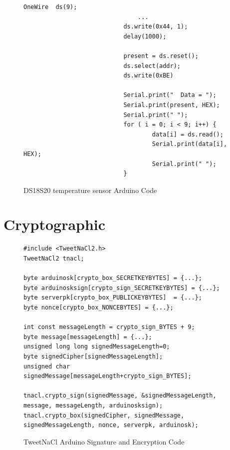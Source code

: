 \begin{figure}[H]
\begin{lstlisting}[style=Arduino]
  							OneWire  ds(9);
								...
  							ds.write(0x44, 1); 
  						 	delay(1000);

  							present = ds.reset();
  							ds.select(addr);    
 							ds.write(0xBE)

  							Serial.print("  Data = "); 
  							Serial.print(present, HEX);
 						 	Serial.print(" ");
  							for ( i = 0; i < 9; i++) {          
    								data[i] = ds.read();
    								Serial.print(data[i], HEX);
    								Serial.print(" ");
  							}

\end{lstlisting}
\caption{DS18S20 temperature sensor Arduino Code}
\label{snip:tempcode}
\end{figure}


\section{Cryptographic}
\begin{figure}[H]
\begin{lstlisting}[style=Arduino]
#include <TweetNaCl2.h>
TweetNaCl2 tnacl;

byte arduinosk[crypto_box_SECRETKEYBYTES] = {...};
byte arduinosksign[crypto_sign_SECRETKEYBYTES] = {...};
byte serverpk[crypto_box_PUBLICKEYBYTES]  = {...};
byte nonce[crypto_box_NONCEBYTES] = {...};

int const messageLength = crypto_sign_BYTES + 9;
byte message[messageLength] = {...};
unsigned long long signedMessageLength=0;
byte signedCipher[signedMessageLength];
unsigned char signedMessage[messageLength+crypto_sign_BYTES];

tnacl.crypto_sign(signedMessage, &signedMessageLength, message, messageLength, arduinosksign);
tnacl.crypto_box(signedCipher, signedMessage, signedMessageLength, nonce, serverpk, arduinosk);
\end{lstlisting}
\caption{TweetNaCl Arduino Signature and Encryption Code}
\label{snip:nacl}
\end{figure}

